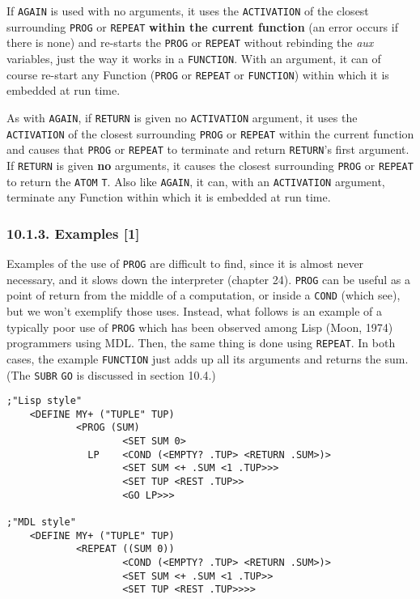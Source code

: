 \documentclass[a4paper,]{article}
\begin{document}
If \texttt{AGAIN} is used with no arguments, it uses the \texttt{ACTIVATION} of the closest surrounding \texttt{PROG} or
\texttt{REPEAT} \textbf{within the current function} (an error occurs if there is none) and re-starts the \texttt{PROG} or
\texttt{REPEAT} without rebinding the \emph{aux} variables, just the way it works in a \texttt{FUNCTION}. With an argument,
it can of course re-start any Function (\texttt{PROG} or \texttt{REPEAT} or \texttt{FUNCTION}) within which it is embedded
at run time.

As with \texttt{AGAIN}, if \texttt{RETURN} is given no \texttt{ACTIVATION} argument, it uses the \texttt{ACTIVATION} of the
closest surrounding \texttt{PROG} or \texttt{REPEAT} within the current function and causes that \texttt{PROG} or
\texttt{REPEAT} to terminate and return \texttt{RETURN}'s first argument. If \texttt{RETURN} is given \textbf{no}
arguments, it causes the closest surrounding \texttt{PROG} or \texttt{REPEAT} to return the \texttt{ATOM} \texttt{T}. Also
like \texttt{AGAIN}, it can, with an \texttt{ACTIVATION} argument, terminate any Function within which it is embedded at
run time.

\subsubsection{10.1.3. Examples {[}1{]}}\label{examples-1-2}

Examples of the use of \texttt{PROG} are difficult to find, since it is almost never necessary, and it slows down the
interpreter (chapter 24). \texttt{PROG} can be useful as a point of return from the middle of a computation, or inside a
\texttt{COND} (which see), but we won't exemplify those uses. Instead, what follows is an example of a typically poor use
of \texttt{PROG} which has been observed among Lisp (Moon, 1974) programmers using MDL. Then, the same thing is done using
\texttt{REPEAT}. In both cases, the example \texttt{FUNCTION} just adds up all its arguments and returns the sum. (The
\texttt{SUBR} \texttt{GO} is discussed in section 10.4.)

\begin{verbatim}
;"Lisp style"
    <DEFINE MY+ ("TUPLE" TUP)
            <PROG (SUM)
                    <SET SUM 0>
              LP    <COND (<EMPTY? .TUP> <RETURN .SUM>)>
                    <SET SUM <+ .SUM <1 .TUP>>>
                    <SET TUP <REST .TUP>>
                    <GO LP>>>

;"MDL style"
    <DEFINE MY+ ("TUPLE" TUP)
            <REPEAT ((SUM 0))
                    <COND (<EMPTY? .TUP> <RETURN .SUM>)>
                    <SET SUM <+ .SUM <1 .TUP>>
                    <SET TUP <REST .TUP>>>>
\end{verbatim}
\end{document}
